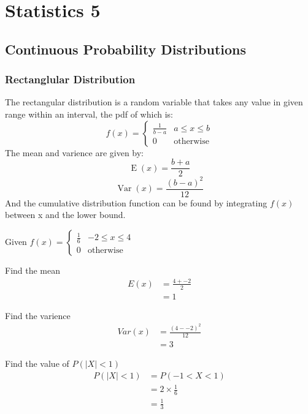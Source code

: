 \chapter{Statistics 5}

\newpage
\section{Continuous Probability Distributions}

    \newpage
    \subsection{Rectanglular Distribution}
        The rectangular distribution is a random variable that takes any value in given range within an interval, the pdf of which is:
        $$
        f(x) = 
        \begin{cases}
        \frac{1}{b - a} & a \leq x \leq b\\
        0 & \text{otherwise}
        \end{cases}
        $$
        The mean and varience are given by:
        $$\operatorname{E}(x) = \frac{b + a}{2}$$
        $$\operatorname{Var}(x) = \frac{(b - a)^2}{12}$$
        And the cumulative distribution function can be found by integrating $f(x)$ between x and the lower bound.

        \begin{example}
        {
            Given $
            f(x) = 
            \begin{cases}
                \frac{1}{6} & -2 \leq x \leq 4\\
                0 & \text{otherwise}
            \end{cases}
            $
        }

        \begin{step}{Find the mean}
        \begin{align*}
        E(x) &= \frac{4 + -2}{2} \\
             &= 1
        \end{align*}
        \end{step}

        \begin{step}{Find the varience}
        \begin{align*}
        Var(x) &= \frac{(4 - -2)^2}{12} \\
               &= 3
        \end{align*}
        \end{step}

        \begin{step}{Find the value of $P(|X| < 1)$}
        \begin{align*}
        P(|X| < 1) &= P(-1 < X < 1) \\
                   &= 2 \times \frac{1}{6} \\
                   &= \frac{1}{3}
        \end{align*}
        \end{step}

        \end{example}

